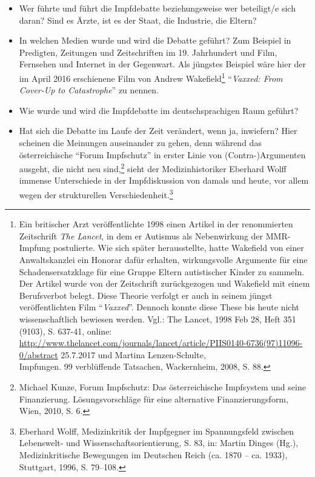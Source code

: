 \documentclass[
    a4paper,
    12pt,
    hyphens,
    chapterprefix=true,
    headheight=33pt,
    footheight=29pt,
    headings=optiontohead,
]{scrartcl}
\begin{document}
\begin{itemize}
\item{Wer führte und führt die Impfdebatte beziehungsweise wer beteiligt/e sich daran? Sind es Ärzte, ist es der Staat, die Industrie, die Eltern?}
\item{In welchen Medien wurde und wird die Debatte geführt? Zum Beispiel in Predigten, Zeitungen und Zeitschriften im 19. Jahrhundert und Film, Fernsehen und Internet in der Gegenwart. Als jüngstes Beispiel wäre hier der im April 2016 erschienene Film von Andrew Wakefield\footnote{Ein britischer Arzt veröffentlichte 1998 einen Artikel in der renommierten Zeitschrift \textit{The Lancet}, in dem er Autismus als Nebenwirkung der MMR-Impfung postulierte. Wie sich später herausstellte, hatte Wakefield von einer Anwaltskanzlei ein Honorar dafür erhalten, wirkungsvolle Argumente für eine Schadensersatzklage für eine Gruppe Eltern autistischer Kinder zu sammeln. Der Artikel wurde von der Zeitschrift zurückgezogen und Wakefield mit einem Berufsverbot belegt. Diese Theorie verfolgt er auch in seinem jüngst veröffentlichten Film "`\textit{Vaxxed}"'. Dennoch konnte diese These bis heute nicht wissenschaftlich bewiesen werden. Vgl.: The Lancet, 1998 Feb 28, Heft 351 (9103), S. 637-41, online: \url{http://www.thelancet.com/journals/lancet/article/PIIS0140-6736(97)11096-0/abstract} 25.7.2017 und Martina Lenzen-Schulte, \\Impfungen. 99 verblüffende Tatsachen, Wackernheim, 2008, S. 88.} "`\textit{Vaxxed: From Cover-Up to Catastrophe}"'} zu nennen.
\item{Wie wurde und wird die Impfdebatte im deutschsprachigen Raum geführt? }
\item{Hat sich die Debatte im Laufe der Zeit verändert, wenn ja, inwiefern? Hier scheinen die Meinungen auseinander zu gehen, denn während das österreichische "`Forum Impfschutz"' in erster Linie von (Contra-)Argumenten ausgeht, die nicht neu sind,\footnote{Michael Kunze, Forum Impfschutz: Das österreichische Impfsystem und seine Finanzierung. Lösungsvorschläge für eine alternative Finanzierungsform, Wien, 2010, S. 6.} sieht der Medizinhistoriker Eberhard Wolff immense Unterschiede in der Impfdiskussion von damals und heute, vor allem wegen der strukturellen Verschiedenheit.\footnote{Eberhard Wolff, Medizinkritik der Impfgegner im Spannungsfeld zwischen Lebenswelt- und Wissenschaftsorientierung, S. 83, in: Martin Dinges (Hg.), Medizinkritische Bewegungen im Deutschen Reich (ca. 1870 -- ca. 1933), Stuttgart, 1996, S. 79--108.} }
\end{itemize}
\end{document}
